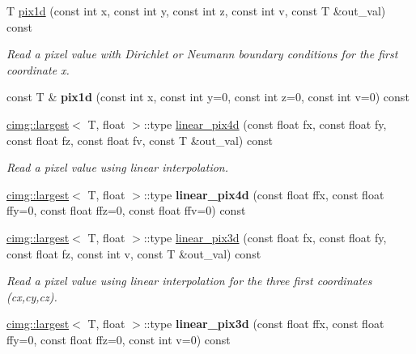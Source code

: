 \begin{DoxyCompactItemize}
\item 
\hypertarget{structcimg__library_1_1_c_img_ab5ef0ea3ac3076504ff33c098abd27ab}{
T \hyperlink{structcimg__library_1_1_c_img_ab5ef0ea3ac3076504ff33c098abd27ab}{pix1d} (const int x, const int y, const int z, const int v, const T \&out\_\-val) const }
\label{structcimg__library_1_1_c_img_ab5ef0ea3ac3076504ff33c098abd27ab}

\begin{DoxyCompactList}\small\item\em Read a pixel value with Dirichlet or Neumann boundary conditions for the first coordinate {\ttfamily x}. \item\end{DoxyCompactList}\item 
\hypertarget{structcimg__library_1_1_c_img_a2103b6e3162dd28485c7ded4ce900ca4}{
const T \& {\bfseries pix1d} (const int x, const int y=0, const int z=0, const int v=0) const }
\label{structcimg__library_1_1_c_img_a2103b6e3162dd28485c7ded4ce900ca4}

\item 
\hyperlink{structcimg__library_1_1cimg_1_1largest}{cimg::largest}$<$ T, float $>$::type \hyperlink{structcimg__library_1_1_c_img_a0048824e103ea2bacefddbef39678a89}{linear\_\-pix4d} (const float fx, const float fy, const float fz, const float fv, const T \&out\_\-val) const 
\begin{DoxyCompactList}\small\item\em Read a pixel value using linear interpolation. \item\end{DoxyCompactList}\item 
\hypertarget{structcimg__library_1_1_c_img_a0bed34d428a60372f0526c2f798c4e9b}{
\hyperlink{structcimg__library_1_1cimg_1_1largest}{cimg::largest}$<$ T, float $>$::type {\bfseries linear\_\-pix4d} (const float ffx, const float ffy=0, const float ffz=0, const float ffv=0) const }
\label{structcimg__library_1_1_c_img_a0bed34d428a60372f0526c2f798c4e9b}

\item 
\hyperlink{structcimg__library_1_1cimg_1_1largest}{cimg::largest}$<$ T, float $>$::type \hyperlink{structcimg__library_1_1_c_img_a1114549ccbf99f3ac826b172df7510ef}{linear\_\-pix3d} (const float fx, const float fy, const float fz, const int v, const T \&out\_\-val) const 
\begin{DoxyCompactList}\small\item\em Read a pixel value using linear interpolation for the three first coordinates ({\ttfamily cx},{\ttfamily cy},{\ttfamily cz}). \item\end{DoxyCompactList}\item 
\hypertarget{structcimg__library_1_1_c_img_ac320e910a368eb1735263db5f6ada1b1}{
\hyperlink{structcimg__library_1_1cimg_1_1largest}{cimg::largest}$<$ T, float $>$::type {\bfseries linear\_\-pix3d} (const float ffx, const float ffy=0, const float ffz=0, const int v=0) const }
\label{structcimg__library_1_1_c_img_ac320e910a368eb1735263db5f6ada1b1}


\end{DoxyCompactItemize}
